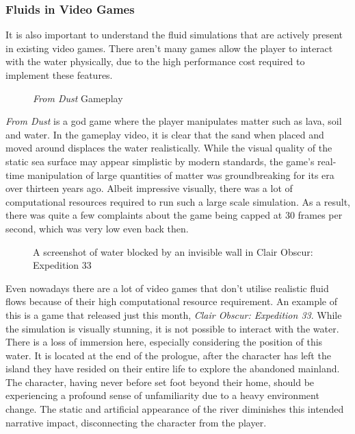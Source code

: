 \documentclass[12pt]{article}
\newcommand{\wideimage}[2][]{%
  \makebox[\textwidth][c]{\texttt{[image: \#2]}}%
}
\begin{document}
    \subsubsection{Fluids in Video Games}

    It is also important to understand the fluid simulations that are actively present in existing video games. There aren't many games allow the player to interact with the water physically, due to the high performance cost required to implement these features.

    \begin{figure}[H]
        \wideimage[]{fromDust.png}
        \caption{\textit{From Dust} Gameplay \cite{fromdustvideo}}
    \end{figure}

    \textit{From Dust}\cite{fromdust} is a god game where the player manipulates matter such as lava, soil and water. In the gameplay video\cite{fromdustvideo}, it is clear that the sand when placed and moved around displaces the water realistically. While the visual quality of the static sea surface may appear simplistic by modern standards, the game's real-time manipulation of large quantities of matter was groundbreaking for its era over thirteen years ago. Albeit impressive visually, there was a lot of computational resources required to run such a large scale simulation. As a result, there was quite a few complaints about the game being capped at 30 frames per second\cite{dsog}, which was very low even back then.
    
    \begin{figure}[H]
        \wideimage[]{clairObscur.png}
        \caption{A screenshot of water blocked by an invisible wall in Clair Obscur: Expedition 33}
    \end{figure}

    Even nowadays there are a lot of video games that don't utilise realistic fluid flows because of their high computational resource requirement. An example of this is a game that released just this month, \textit{Clair Obscur: Expedition 33}\cite{clairobscur}.
    While the simulation is visually stunning, it is not possible to interact with the water. There is a loss of immersion here, especially considering the position of this water. It is located at the end of the prologue, after the character has left the island they have resided on their entire life to explore the abandoned mainland. The character, having never before set foot beyond their home, should be experiencing a profound sense of unfamiliarity due to a heavy environment change. The static and artificial appearance of the river diminishes this intended narrative impact, disconnecting the character from the player.
\end{document}
